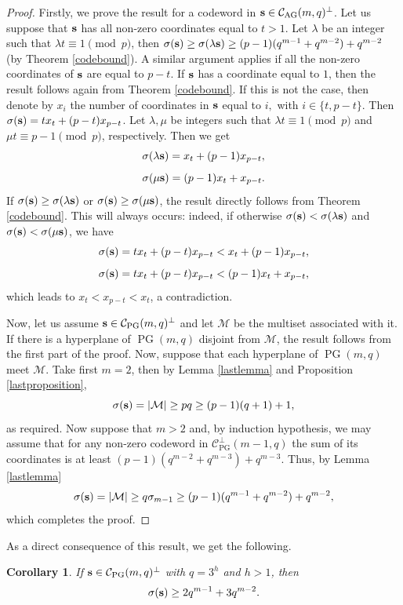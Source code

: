 \documentclass[12pt]{article}
\newcommand{\cC}{{\mathcal C}}
\newcommand{\cM}{{\mathcal M}}
\newtheorem{corollary}[theorem]{Corollary}
\DeclareMathOperator{\PG}{{PG}}
\DeclareMathOperator{\AG}{{AG}}
\begin{document}
	\begin{proof}
		Firstly, we prove the result for a codeword in ${ \bf s} \in \cC_{\AG}(m,q)^{\perp}$. Let us suppose that ${ \bf s }$ has all non-zero  coordinates equal to $t>1$. Let $\lambda$ be an integer such that $\lambda t \equiv 1 \pmod p$, then $\sigma( { \bf s}) \geq \sigma(\lambda { \bf s} ) \geq (p-1)(q^{m-1}+q^{m-2})+q^{m-2}$ (by Theorem \ref{codebound}). A similar argument applies if all the non-zero coordinates of ${\bf s}$ are equal to $p-t$. If ${\bf s}$ has a coordinate equal to $1$, then the result follows again from Theorem \ref{codebound}. 
		If this is not the case, then denote by $x_i$ the number of coordinates in ${\bf s}$ equal to $i,$ with $i \in \{ t, p-t\}$. Then $\sigma ({\bf s})= t x_t + (p-t) x_{p-t}$. Let $\lambda,\mu$ be integers such that $\lambda t \equiv 1 \pmod p$ and $\mu t \equiv p-1 \pmod p$, respectively. Then we get
		\[\sigma(\lambda{\bf s})=x_t+(p-1)x_{p-t},\]
		\[\sigma(\mu {\bf s})=(p-1)x_t+x_{p-t}.\]
		If $\sigma ({\bf s}) \geq \sigma (\lambda {\bf s})$ or $\sigma ({\bf s}) \geq \sigma (\mu {\bf s})$, the result directly follows from Theorem \ref{codebound}. This will always occurs: indeed, if otherwise $\sigma ({\bf s}) < \sigma (\lambda {\bf s})$ and $\sigma ({\bf s}) < \sigma (\mu {\bf s})$, we have
		\[\sigma( {\bf s }) = tx_t+(p-t)x_{p-t}< x_t + (p-1)x_{p-t},\]
		\[\sigma( {\bf s }) = tx_t+(p-t)x_{p-t}< (p-1)x_t+x_{p-t},\]
		which leads to $x_{t} < x_{p-t} < x_t$, a contradiction.
		
		Now, let us assume ${ \bf s } \in \cC_{\PG}(m,q)^{\perp}$ and  let $\cM$ be the multiset associated with it. If there is a hyperplane of $\PG(m,q)$ disjoint from $\cM$, the result follows from the first part of the proof. Now, suppose that each hyperplane of $\PG(m,q)$ meet $\cM$.
		Take first $m = 2$, then  by Lemma \ref{lastlemma} and Proposition \ref{lastproposition},
		$$\sigma({\bf s})= \vert \cM \vert \geq p q \geq (p-1)(q+1)+1,$$ as required. Now suppose that $m > 2$ and, by induction hypothesis,  we may assume that for any non-zero codeword in $\cC^\perp_{\PG}(m-1,q)$ the sum of its coordinates is at least $(p-1)(q^{m-2}+q^{m-3})+q^{m-3}$.  Thus, by Lemma \ref{lastlemma}
		\[
		\sigma( {\bf s}) = \vert \cM \vert  \geq 
		q \sigma_{m-1}  \geq (p-1)(q^{m-1}+q^{m-2})+q^{m-2}  ,
		\]
		which completes the proof. 
	\end{proof}
	
	As a direct consequence of this result, we get the following.
	
	\begin{corollary}
		If ${\bf s}\in \cC_{\PG}(m,q)^\perp$ with  $q=3^h$ and $h>1$, then
		\begin{equation}
			\sigma({\bf s}) \geq 2q^{m-1}+3q^{m-2}.
		\end{equation}
		
		
		
	\end{corollary}
	
\end{document}
